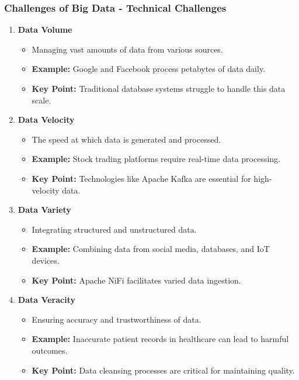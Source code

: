 \documentclass[aspectratio=169]{beamer}
\begin{document}
\begin{frame}[fragile]
    \frametitle{Challenges of Big Data - Technical Challenges}
    \begin{enumerate}
        \item \textbf{Data Volume}
        \begin{itemize}
            \item Managing vast amounts of data from various sources.
            \item \textbf{Example:} Google and Facebook process petabytes of data daily.
            \item \textbf{Key Point:} Traditional database systems struggle to handle this data scale.
        \end{itemize}
        
        \item \textbf{Data Velocity}
        \begin{itemize}
            \item The speed at which data is generated and processed.
            \item \textbf{Example:} Stock trading platforms require real-time data processing.
            \item \textbf{Key Point:} Technologies like Apache Kafka are essential for high-velocity data.
        \end{itemize}
        
        \item \textbf{Data Variety}
        \begin{itemize}
            \item Integrating structured and unstructured data.
            \item \textbf{Example:} Combining data from social media, databases, and IoT devices.
            \item \textbf{Key Point:} Apache NiFi facilitates varied data ingestion.
        \end{itemize}
        
        \item \textbf{Data Veracity}
        \begin{itemize}
            \item Ensuring accuracy and trustworthiness of data.
            \item \textbf{Example:} Inaccurate patient records in healthcare can lead to harmful outcomes.
            \item \textbf{Key Point:} Data cleansing processes are critical for maintaining quality.
        \end{itemize}
    \end{enumerate}
\end{frame}
\end{document}

